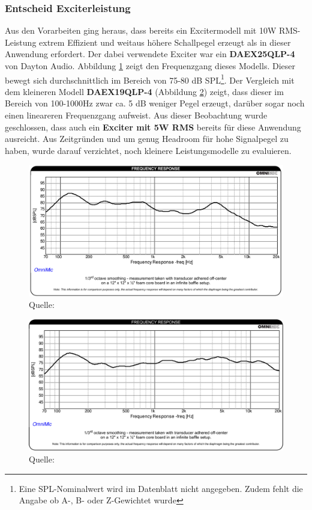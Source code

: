 \subsubsection{Entscheid Exciterleistung}
Aus den Vorarbeiten ging heraus, dass bereits ein Excitermodell mit 10W RMS-Leistung extrem Effizient und weitaus höhere Schallpegel erzeugt als in dieser Anwendung erfordert. Der dabei verwendete Exciter war ein \textbf{DAEX25QLP-4} von Dayton Audio. Abbildung \ref{pics:DAEX25QLP4_freqresp} zeigt den Frequenzgang dieses Modells. Dieser bewegt sich durchschnittlich im Bereich von 75-80 dB SPL\footnote{Eine SPL-Nominalwert wird im Datenblatt nicht angegeben. Zudem fehlt die Angabe ob A-, B- oder Z-Gewichtet wurde}. Der Vergleich mit dem kleineren Modell \textbf{DAEX19QLP-4} (Abbildung \ref{pics:DAEX19QLP4_freqresp}) zeigt, dass dieser im Bereich von 100-1000Hz zwar ca. 5 dB weniger Pegel erzeugt, darüber sogar noch einen lineareren Frequenzgang aufweist. Aus dieser Beobachtung wurde geschlossen, dass auch ein \textbf{Exciter mit 5W RMS} bereits für diese Anwendung ausreicht. Aus Zeitgründen und um genug Headroom für hohe Signalpegel zu haben, wurde darauf verzichtet, noch kleinere Leistungsmodelle zu evaluieren.
\begin{figure}[H]
	\centering
	\includegraphics[width=\textwidth*7/8]{pictures/DAEX25QLP4_freqresp.png}
	\caption{Quelle: \cite{DAEX25QLP4spec}}
	\label{pics:DAEX25QLP4_freqresp}
\end{figure}
\begin{figure}[H]
	\centering
	\includegraphics[width=\textwidth*7/8]{pictures/DAEX19QLP4_freqresp.png}
	\caption{Quelle: \cite{DAEX19QLP4spec}}
	\label{pics:DAEX19QLP4_freqresp}
\end{figure}
